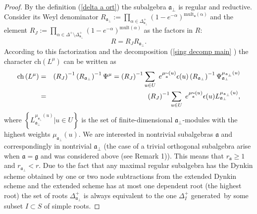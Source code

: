 \documentclass[12pt]{article}
\theoremstyle{definition}
\newcommand{\gf}{\mathfrak{g}}
\newcommand{\af}{\mathfrak{a}}
\newcommand{\afb}{\mathfrak{a}_{\bot}}
\begin{document}
\bigskip
\begin{proof}
By the definition (\ref{delta a ort}) the subalgebra $%
\mathfrak{a}_{\bot }$ is regular and reductive. Consider its Weyl
denominator $R_{\afb}:=\prod_{\alpha \in \Delta _{\af%
_{\perp }}^{+}}\left( 1-e^{-\alpha }\right) ^{\mathrm{mult}_{\af}%
\mathrm{\left( \alpha \right) }}$ and the element $R_{J}:=\prod_{\alpha \in
\Delta ^{+}\setminus \Delta _{\afb}^{+}}\left( 1-e^{-\alpha
}\right) ^{\mathrm{mult}(\alpha )}$ as the factors in $R$: $\quad $%
\begin{equation*}
R=R_{J}R_{\afb}.
\end{equation*}
According to this factorization and the decomposition (\ref{sing decomp main}%
) the character $\mathrm{ch}\left( L^{\mu }\right) $ can be written as
\begin{eqnarray*}
\mathrm{ch}\left( L^{\mu }\right) &=&\left( R_{J}\right) ^{-1}\left( R_{%
\afb}\right) ^{-1}\Psi ^{\mu }=\left( R_{J}\right)
^{-1}\sum_{u\in U}\;e^{\mu _{\widetilde{\af}}\left( u\right) }\epsilon
(u)\left( R_{\afb}\right) ^{-1}\Psi _{\afb}^{\mu _{%
\afb}\left( u\right) } \\
&=&\left( R_{J}\right) ^{-1}\sum_{u\in U}\;e^{\mu _{\widetilde{\af}%
}\left( u\right) }\epsilon (u)L_{\afb}^{\mu _{\afb}\left( u\right) },
\end{eqnarray*}
where $\left\{ L_{\afb}^{\mu _{\afb}\left(
u\right) }|u\in U\right\} $ is the set of finite-dimensional $\af%
_{\perp }$-modules with the highest weights $\mu _{\afb}\left(
u\right) $. We are interested in nontrivial subalgebras $\af$ and
correspondingly in nontrivial $\afb$ (the case of a trivial
orthogonal subalgebra arise when $\af=\gf$ and was considered
above (see Remark 1)). This means that $r_{\af}\geq 1$ and $r_{\af%
_{\perp }}<r$. Due to the fact that any maximal regular subalgebra has the
Dynkin scheme obtained by one or two node subtractions from the extended
Dynkin scheme and the extended scheme has at most one dependent root (the
highest root) the set of roots $\Delta _{\afb}^{+}$ is always
equivalent to the one $\Delta _{I}^{+}$ generated\ by some subset $I\subset
S $ of simple roots.


\end{proof}
\end{document}
